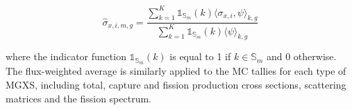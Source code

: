 \begin{equation}
\label{eqn:lns-micro}
\hat{\sigma}_{x,i,m,g} = \frac{\displaystyle\sum\limits_{k=1}^{K}\mathbb{1}_{\mathbb{S}_{m}}(k) \langle \sigma_{x,i}, \psi \rangle_{k,g}}{\displaystyle\sum\limits_{k=1}^{K}\mathbb{1}_{\mathbb{S}_{m}}(k) \langle \psi \rangle_{k,g}}
\end{equation}

\noindent where the indicator function $\mathbb{1}_{\mathbb{S}_{m}}(k)$ is equal to 1 if $k \in \mathbb{S}_{m}$ and 0 otherwise. The flux-weighted average is similarly applied to the MC tallies for each type of MGXS, including total, capture and fission production cross sections, scattering matrices and the fission spectrum.
